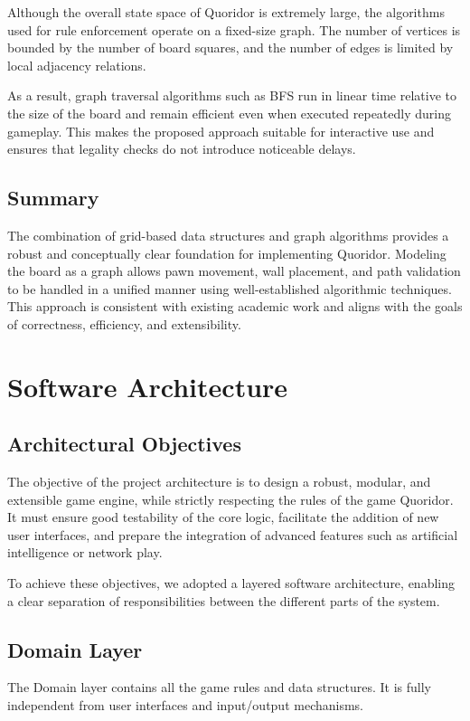 \documentclass[a4paper]{article}
\begin{document}
Although the overall state space of Quoridor is extremely large, the
algorithms used for rule enforcement operate on a fixed-size graph. The number
of vertices is bounded by the number of board squares, and the number of edges
is limited by local adjacency relations.

As a result, graph traversal algorithms such as BFS run in linear time
relative to the size of the board and remain efficient even when executed
repeatedly during gameplay. This makes the proposed approach suitable for
interactive use and ensures that legality checks do not introduce noticeable
delays.

\subsection{Summary}

The combination of grid-based data structures and graph algorithms provides a
robust and conceptually clear foundation for implementing Quoridor. Modeling
the board as a graph allows pawn movement, wall placement, and path validation
to be handled in a unified manner using well-established algorithmic
techniques. This approach is consistent with existing academic work and aligns
with the goals of correctness, efficiency, and extensibility.

\section{Software Architecture}

\subsection{Architectural Objectives}
The objective of the project architecture is to design a robust, modular, and extensible game engine, while strictly respecting the rules of the game Quoridor. It must ensure good testability of the core logic, facilitate the addition of new user interfaces, and prepare the integration of advanced features such as artificial intelligence or network play.

To achieve these objectives, we adopted a layered software architecture, enabling a clear separation of responsibilities between the different parts of the system.

\subsection{Domain Layer}
The Domain layer contains all the game rules and data structures. It is fully independent from user interfaces and input/output mechanisms.
\end{document}
